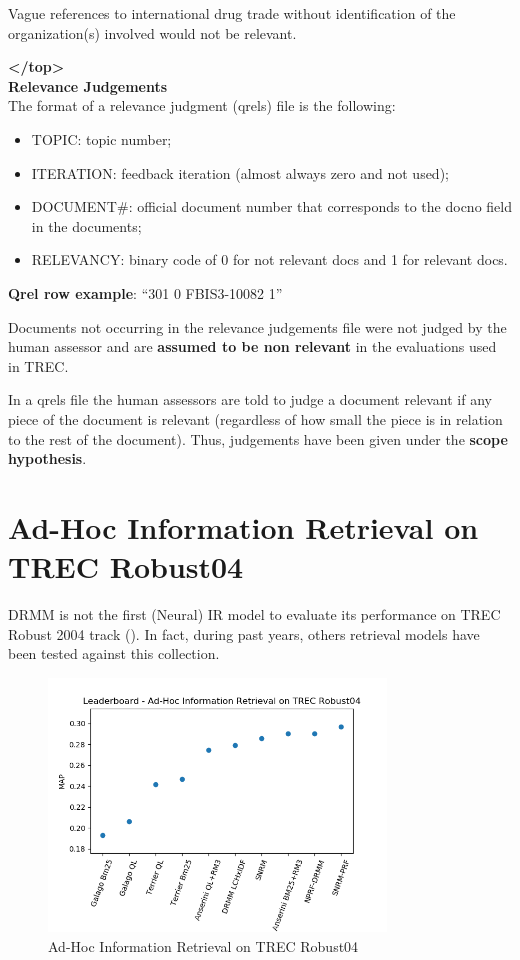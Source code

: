 Vague references to international drug trade without identification of the
organization(s) involved would not be relevant.

\textbf{</top>}\\

\textbf{Relevance Judgements}\\

The format of a relevance judgment (qrels) file is the following:

\begin{itemize}
\item TOPIC: topic number;
\item ITERATION: feedback iteration (almost always zero and not used);
\item DOCUMENT\#: official document number that corresponds to the docno field in the documents;
\item RELEVANCY: binary code of 0 for not relevant docs and 1 for relevant docs.
\end{itemize}

\textbf{Qrel row example}: ``301 0 FBIS3-10082 1''

Documents not occurring in the relevance judgements file were not judged by the human assessor and are \textbf{assumed to be non relevant} in the evaluations used in TREC.

In a qrels file the human assessors are told to judge a document relevant if any
piece of the document is relevant (regardless of how small the piece is in
relation to the rest of the document). Thus, judgements have been given under the \textbf{scope hypothesis}.

\section{Ad-Hoc Information Retrieval on TREC Robust04}
\label{sec:leaderboadrobust04}

DRMM is not the first (Neural) IR model to evaluate its performance on TREC Robust 2004 track (\cite{rob04}). In fact, during past years, others retrieval models have been tested against this collection.

\begin{figure}[H]
  \centering
  \includegraphics[width=0.8\textwidth]{res/img/EvalRobust04.png}
  \caption{Ad-Hoc Information Retrieval on TREC Robust04}
  \label{fig:evalRob04}
\end{figure}

